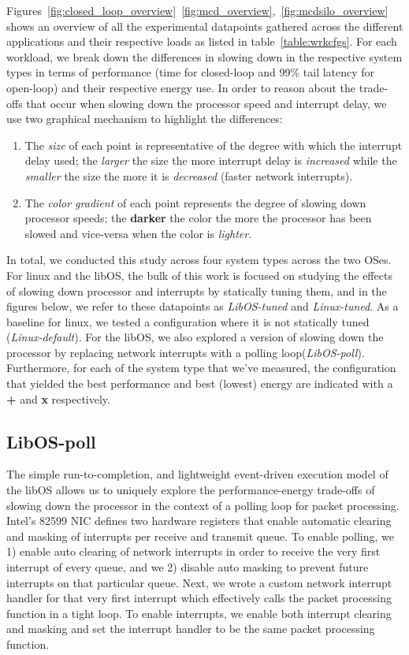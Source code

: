 \label{sec:exp}
Figures~\ref{fig:closed_loop_overview}~\ref{fig:mcd_overview},~\ref{fig:mcdsilo_overview} shows an overview of all the experimental datapoints gathered across the different applications and their respective loads as listed in table~\ref{table:wrkcfgs}. For each workload, we break down the differences in slowing down in the respective system types in terms of performance (time for closed-loop and 99\% tail latency for open-loop) and their respective energy use. In order to reason about the trade-offs that occur when slowing down the processor speed and interrupt delay, we use two graphical mechanism to highlight the differences: 
\begin{enumerate}
    \item The \textit{size} of each point is representative of the degree with which the interrupt delay used; the \textit{larger} the size the more interrupt delay is \textit{increased} while the \textit{smaller} the size the more it is \textit{decreased} (faster network interrupts).
    \item The \textit{color gradient} of each point represents the degree of slowing down processor speeds; the \textbf{darker} the color the more the processor has been slowed and vice-versa when the color is \textit{lighter}.
\end{enumerate}

In total, we conducted this study across four system types across the two OSes. For linux and the libOS, the bulk of this work is focused on studying the effects of slowing down processor and interrupts by statically tuning them, and in the figures below, we refer to these datapoints as \textit{LibOS-tuned} and \textit{Linux-tuned}. As a baseline for linux, we tested a configuration where it is not statically tuned (\textit{Linux-default}). For the libOS, we also explored a version of slowing down the processor by replacing network interrupts with a polling loop(\textit{LibOS-poll}). Furthermore, for each of the system type that we've measured, the configuration that yielded the best performance and best (lowest) energy are indicated with a {\larger[4]\textbf{+}} and {\larger[4]\textbf{x}} respectively.

\subsection{LibOS-poll}
The simple run-to-completion, and lightweight event-driven execution model of the libOS allows us to uniquely explore the performance-energy trade-offs of slowing down the processor in the context of a polling loop for packet processing. Intel's 82599 NIC defines two hardware registers that enable automatic clearing and masking of interrupts per receive and transmit queue. To enable polling, we 1) enable auto clearing of network interrupts in order to receive the very first interrupt of every queue, and we 2) disable auto masking to prevent future interrupts on that particular queue. Next, we wrote a custom network interrupt handler for that very first interrupt which effectively calls the packet processing function in a tight loop. To enable interrupts, we enable both interrupt clearing and masking and set the interrupt handler to be the same packet processing function.